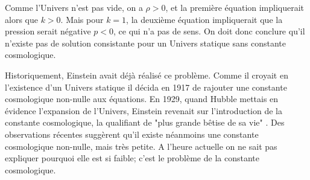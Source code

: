 \documentclass[a4paper,12pt]{report}
\theoremstyle{plain}
\theoremstyle{plain}
\begin{document}
 Comme l'Univers n'est pas vide, on a $\rho >0$, et la premi\`ere \'equation impliquerait alors que $k>0$. Mais pour $k=1$, la deuxi\`eme \'equation impliquerait que la pression serait n\'egative $p<0$, ce qui n'a pas de sens. On doit donc conclure qu'il n'existe pas de solution consistante pour un Univers statique sans constante cosmologique. 
 
 
 Historiquement, Einstein avait d\'ej\`a r\'ealis\'e ce probl\`eme. Comme il croyait en l'existence d'un Univers statique il d\'ecida en 1917 de rajouter une constante cosmologique non-nulle aux \'equations. En 1929, quand Hubble mettais en \'evidence l'expansion de l'Univers, Einstein revenait sur l'introduction de la constante cosmologique, la qualifiant de "plus grande b\^etise de sa vie" . Des observations r\'ecentes sugg\`erent qu'il existe n\'eanmoins une constante cosmologique non-nulle, mais tr\`es petite. A l'heure actuelle on ne sait pas expliquer pourquoi elle est si faible; c'est le probl\`eme de la constante cosmologique.  \\
 
\end{document}
